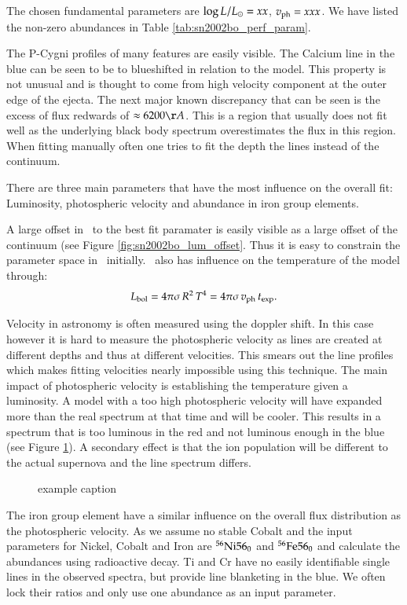 The chosen fundamental parameters are $\log{L/L_\odot}=xx$, $v_{\rm ph}=xxx$. We have listed the non-zero abundances in Table \ref{tab:sn2002bo_perf_param}. 



The P-Cygni profiles of many features are easily visible. The Calcium line in the blue can be seen to be to blueshifted in relation to the model. This property is not unusual and is thought to come from high velocity component at the outer edge of the ejecta. The next major known discrepancy that can be seen is the excess of flux redwards of  $\approx 6200 \AA$.  This is a region that usually does not fit well as the underlying black body spectrum overestimates the flux in this region. When fitting manually often one tries to fit the depth the lines instead of the continuum.

There are three main parameters that have the most influence on the overall fit: Luminosity, photospheric velocity and abundance in iron group elements.

A large offset in \lum\ to the best fit paramater is easily visible as a large offset of the continuum (see Figure \ref{fig:sn2002bo_lum_offset}. Thus it is easy to constrain the parameter space in \lum\ initially. \lum\ also has influence on the temperature of the model through:
\[
L_{\rm bol} = 4\pi\sigma\, R^2\,T^4 = 4\pi\sigma\,v_{\rm ph}\,t_{\rm exp}.
\label{eq:lum_temp_relation}
\]

Velocity in astronomy is often measured using the doppler shift. In this case however it is hard to measure the photospheric velocity as lines are created at different depths and thus at different velocities. This smears out the line profiles which makes fitting velocities nearly impossible using this technique. 
The main impact of photospheric velocity is establishing the temperature given a luminosity. A model with a too high photospheric velocity will have expanded more than the real spectrum at that time and will be cooler. This results in a spectrum that is too luminous in the red and not luminous enough in the blue (see Figure \ref{fig:sn2002bo_vph_offset}). 
A secondary effect is that the ion population will be different to the actual supernova and the line spectrum differs.
\begin{figure}[htbp] %
   \centering
   \caption{example caption}
   \label{fig:sn2002bo_vph_offset}
\end{figure}

The iron group element have a similar influence on the overall flux distribution as the photospheric velocity. 
As we assume no stable Cobalt and the input parameters for Nickel, Cobalt and Iron are $^{56}\textrm{Ni}{56}_0$ and $^{56}\textrm{Fe}{56}_0$ and calculate the abundances using radioactive decay. Ti and Cr have no easily identifiable single lines in the observed spectra, but provide line blanketing in the blue. We often lock their ratios and only use one abundance as an input parameter. 

